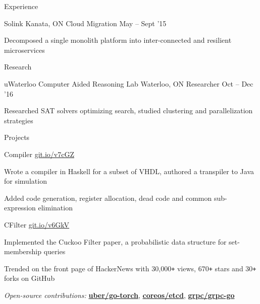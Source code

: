 \documentclass{resume} %
\begin{document}
\begin{rSection}{Experience}
  \begin{rSubsection}{Solink}
                     {Kanata, ON}
                     {Cloud Migration}
                     {May -- Sept '15}

   \item Decomposed a single monolith platform into inter-connected and
      resilient microservices
  \end{rSubsection}
\end{rSection}


\begin{rSection}{Research}
  \begin{rSubsection}{uWaterloo Computer Aided Reasoning Lab}
                     {Waterloo, ON}
                     {Researcher}
                     {Oct -- Dec '16}
   \item Researched SAT solvers optimizing search, studied
     clustering and parallelization strategies
  \end{rSubsection}
\end{rSection}


\begin{rSection}{Projects}
  \begin{rSubsection}{Compiler}
                     {\href{https://git.io/v7cGZ}{git.io/v7cGZ}}
                     {}{}
   \item Wrote a compiler in Haskell for a subset of VHDL, authored a
     transpiler to Java for simulation
   \item Added code generation, register allocation, dead code and common
     sub-expression elimination
  \end{rSubsection}

  \begin{rSubsection}{CFilter}
    {\href{https://git.io/v6GkV}{git.io/v6GkV}}
                     {}{}
     \item Implemented the Cuckoo Filter paper, a probabilistic data structure for
       set-membership queries
     \item Trended on the front page of HackerNews with 30,000\texttt{+} views,
       670\texttt{+} stars and 30\texttt{+} forks on GitHub
  \end{rSubsection}

  \begin{rMinisection}
    \item {\em Open-source contributions:}
      \href{https://github.com/uber/go-torch}{\textbf{uber/go-torch}},
      \href{https://github.com/coreos/etcd}{\textbf{coreos/etcd}},
      \href{https://github.com/grpc/grpc-go}{\textbf{grpc/grpc-go}}
  \end{rMinisection}
\end{rSection}
\end{document}
